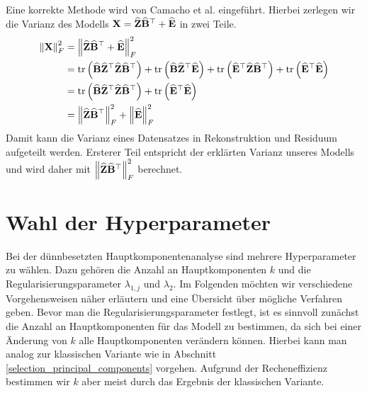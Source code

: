 Eine korrekte Methode wird von Camacho et al. eingeführt. Hierbei zerlegen wir die Varianz des Modells $\mathbf{X} = \widehat{\mathbf{Z}} \widehat{\mathbf{B}}^{\top} + \widehat{\mathbf{E}}$ in zwei Teile.
\begin{align}
\label{camacho_explained_variance}
\left\lVert \mathbf{X} \right\rVert_F^2 & = \left\lVert \widehat{\mathbf{Z}} \widehat{\mathbf{B}}^{\top} + \widehat{\mathbf{E}} \right\rVert_{F}^{2} \nonumber\\
& = \text{tr} \left( \widehat{\mathbf{B}} \widehat{\mathbf{Z}}^{\top} \widehat{\mathbf{Z}} \widehat{\mathbf{B}}^{\top} \right) + \text{tr} \left( \widehat{\mathbf{B}} \widehat{\mathbf{Z}}^{\top} \widehat{\mathbf{E}} \right) + \text{tr} \left( \widehat{\mathbf{E}}^{\top}\widehat{\mathbf{Z}} \widehat{\mathbf{B}}^{\top} \right) + \text{tr} \left( \widehat{\mathbf{E}}^{\top} \widehat{\mathbf{E}} \right) \nonumber\\
& = \text{tr} \left( \widehat{\mathbf{B}} \widehat{\mathbf{Z}}^{\top} \widehat{\mathbf{Z}} \widehat{\mathbf{B}}^{\top} \right) + \text{tr} \left( \widehat{\mathbf{E}}^{\top} \widehat{\mathbf{E}} \right) \nonumber\\
& = \left\lVert \widehat{\mathbf{Z}} \widehat{\mathbf{B}}^{\top} \right\rVert_{F}^{2} + \left\lVert \widehat{\mathbf{E}} \right\rVert_{F}^{2}
\end{align}
Damit kann die Varianz eines Datensatzes in Rekonstruktion und Residuum aufgeteilt werden. Ersterer Teil entspricht der erklärten Varianz unseres Modells und wird daher mit $\left\lVert \widehat{\mathbf{Z}} \widehat{\mathbf{B}}^{\top} \right\rVert_{F}^{2}$ berechnet. 



\section{Wahl der Hyperparameter}
\label{choice_of_tuning_parameters}

Bei der dünnbesetzten Hauptkomponentenanalyse sind mehrere Hyperparameter zu wählen. Dazu gehören die Anzahl an Hauptkomponenten $k$ und die Regularisierungsparameter $\lambda_{1,j}$ und $\lambda_2$. Im Folgenden möchten wir verschiedene Vorgehensweisen näher erläutern und eine Übersicht über mögliche Verfahren geben. Bevor man die Regularisierungsparameter festlegt, ist es sinnvoll zunächst die Anzahl an Hauptkomponenten für das Modell zu bestimmen, da sich bei einer Änderung von $k$ alle Hauptkomponenten verändern können. Hierbei kann man analog zur klassischen Variante wie in Abschnitt \ref{selection_principal_components} vorgehen. Aufgrund der Recheneffizienz bestimmen wir $k$ aber meist durch das Ergebnis der klassischen Variante.

